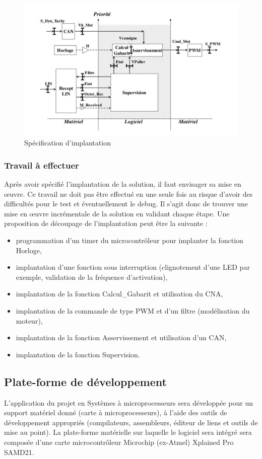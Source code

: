 \documentclass[a4paper]{article}
\begin{document}
	\begin{figure}[htbp]
		\centering
		\includegraphics[width=0.9\linewidth]{Specification_implantation.jpg}
		\caption{Spécification d’implantation}
		\label{pic4}
	\end{figure}
	\newpage
	\subsubsection{Travail à effectuer}
	Après avoir spécifié l’implantation de la solution, il faut envisager sa mise en œuvre. Ce travail ne doit pas être effectué en une seule fois au risque d’avoir des difficultés pour le test et éventuellement le debug. Il s’agit donc de trouver une mise en œuvre incrémentale de la solution en validant chaque étape. Une proposition de découpage de l’implantation peut être la suivante :
	\begin{itemize}
		\item programmation d’un timer du microcontrôleur pour implanter la fonction Horloge,
		\item implantation d’une fonction sous interruption (clignotement d’une LED par exemple, validation de la fréquence d’activation),
		\item implantation de la fonction Calcul\_Gabarit et utilisation du CNA,
		\item implantation de la commande de type PWM et d’un filtre (modélisation du moteur),
		\item implantation de la fonction Asservissement et utilisation d’un CAN,
		\item implantation de la fonction Supervision.
	\end{itemize}
	
	\subsection{Plate-forme de développement}
	L’application du projet en Systèmes à microprocesseurs sera développée pour un support matériel donné (carte à microprocesseurs), à l’aide des outils de développement appropriés (compilateurs, assembleurs, éditeur de liens et outils de mise au point). La plate-forme matérielle sur laquelle le logiciel sera intégré sera composée d’une carte microcontrôleur Microchip (ex-Atmel) Xplained Pro SAMD21.
\end{document}
